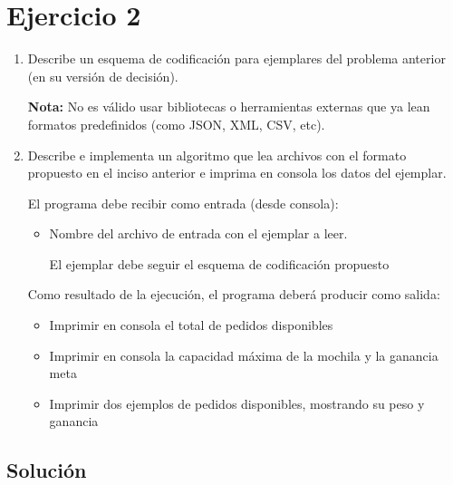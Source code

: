 \section{Ejercicio 2}

\begin{tcolorbox}[enunciado]
\begin{enumerate}[label=(\alph*), leftmargin=*]
    \item Describe un esquema de codificación para ejemplares del problema anterior (en su versión de decisión).
    
    \textbf{Nota:} No es válido usar bibliotecas o herramientas externas que ya lean formatos predefinidos (como JSON, XML, CSV, etc).

    \item Describe e implementa un algoritmo que lea archivos con el formato propuesto en el inciso anterior e imprima en consola los datos del ejemplar.

    El programa debe recibir como entrada (desde consola):
    \begin{itemize}[leftmargin=*]
        \item Nombre del archivo de entrada con el ejemplar a leer.
        
        El ejemplar debe seguir el esquema de codificación propuesto
    \end{itemize}

    Como resultado de la ejecución, el programa deberá producir como salida:
    \begin{itemize}[leftmargin=*]
        \item Imprimir en consola el total de pedidos disponibles
        \item Imprimir en consola la capacidad máxima de la mochila y la ganancia meta
        \item Imprimir dos ejemplos de pedidos disponibles, mostrando su peso y ganancia
    \end{itemize}
\end{enumerate}
\end{tcolorbox}

\subsection{Solución}
